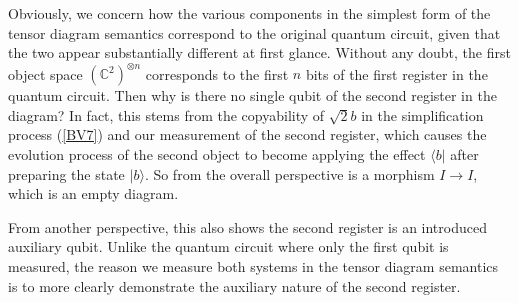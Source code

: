 \documentclass[a4paper,twocolumn,11pt,unpublished]{quantumarticle}
\numberwithin{equation}{section}
\begin{document}
Obviously, we concern how the various components in the simplest form of the tensor diagram semantics correspond to the original quantum circuit, given that the two appear substantially different at first glance. Without any doubt, the first object space $(\mathbb{C}^2)^{\otimes n}$ corresponds to the first $n$ bits of the first register in the quantum circuit. Then why is there no single qubit of the second register in the diagram? In fact, this stems from the copyability of $\sqrt{2}b$ in the simplification process (\ref{BV7}) and our measurement of the second register, which causes the evolution process of the second object to become applying the effect $\langle b \vert$ after preparing the state $\vert b \rangle$. So from the overall perspective is a morphism $I \rightarrow I$, which is an empty diagram.
\begin{center}
\end{center}
From another perspective, this also shows the second register is an introduced auxiliary qubit. Unlike the quantum circuit where only the first qubit is measured, the reason we measure both systems in the tensor diagram semantics is to more clearly demonstrate the auxiliary nature of the second register.
\end{document}
